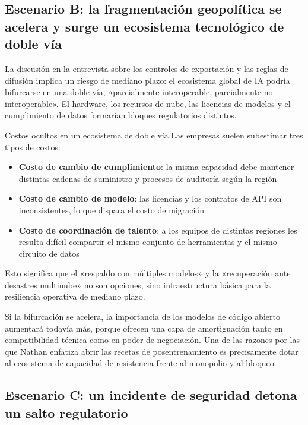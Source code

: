 \subsection{Escenario B: la fragmentación geopolítica se acelera y surge un ecosistema tecnológico de doble vía}

La discusión en la entrevista sobre los controles de exportación y las reglas de difusión implica un riesgo de mediano plazo: el ecosistema global de IA podría bifurcarse en una doble vía, «parcialmente interoperable, parcialmente no interoperable». El hardware, los recursos de nube, las licencias de modelos y el cumplimiento de datos formarían bloques regulatorios distintos.

\begin{warningbox}{Costos ocultos en un ecosistema de doble vía}
Las empresas suelen subestimar tres tipos de costos:
\begin{itemize}
    \item \textbf{Costo de cambio de cumplimiento}: la misma capacidad debe mantener distintas cadenas de suministro y procesos de auditoría según la región
    \item \textbf{Costo de cambio de modelo}: las licencias y los contratos de API son inconsistentes, lo que dispara el costo de migración
    \item \textbf{Costo de coordinación de talento}: a los equipos de distintas regiones les resulta difícil compartir el mismo conjunto de herramientas y el mismo circuito de datos
\end{itemize}

Esto significa que el «respaldo con múltiples modelos» y la «recuperación ante desastres multinube» no son opciones, sino infraestructura básica para la resiliencia operativa de mediano plazo.
\end{warningbox}

Si la bifurcación se acelera, la importancia de los modelos de código abierto aumentará todavía más, porque ofrecen una capa de amortiguación tanto en compatibilidad técnica como en poder de negociación. Una de las razones por las que Nathan enfatiza abrir las recetas de posentrenamiento es precisamente dotar al ecosistema de capacidad de resistencia frente al monopolio y al bloqueo.

\subsection{Escenario C: un incidente de seguridad detona un salto regulatorio}

